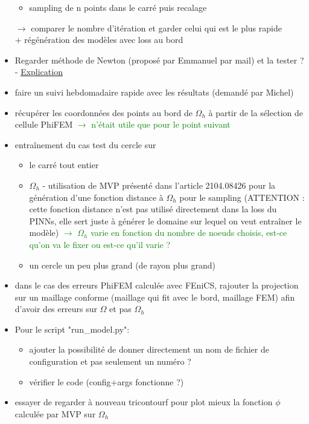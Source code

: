 \begin{itemize}[label=$\square$]
\begin{itemize}[label=\LARGE $\circ$]
		\item sampling de n points dans le carré puis recalage
	\end{itemize}
	$\rightarrow$ comparer le nombre d'itération et garder celui qui est le plus rapide \\
	+ régénération des modèles avec loss au bord
	\item Regarder méthode de Newton (proposé par Emmanuel par mail) et la tester ? - \href{https://www.mathweb.fr/euclide/methode-de-newton/}{Explication}
	\item[\done] faire un suivi hebdomadaire rapide avec les résultats (demandé par Michel)
	\item[\wontfix] récupérer les coordonnées des points au bord de $\Omega_h$ à partir de la sélection de cellule PhiFEM \textcolor{Green}{$\rightarrow$ n'était utile que pour le point suivant}
	\item entraînement du cas test du cercle sur 
	\begin{itemize}[label=\LARGE $\circ$]
		\item le carré tout entier
		\item[\swontfix] $\Omega_h$ - utilisation de MVP présenté dans l'article 2104.08426 pour la génération d'une fonction distance à $\Omega_h$ pour le sampling (ATTENTION : cette fonction distance n'est pas utilisé directement dans la loss du PINNs, elle sert juste à générer le domaine sur lequel on veut entraîner le modèle) \textcolor{Green}{$\rightarrow$ $\Omega_h$ varie en fonction du nombre de noeuds choisis, est-ce qu'on va le fixer ou est-ce qu'il varie ?}
		\item un cercle un peu plus grand (de rayon plus grand) 
	\end{itemize}
	\item dans le cas des erreurs PhiFEM calculée avec FEniCS, rajouter la projection sur un maillage conforme (maillage qui fit avec le bord, maillage FEM) afin d'avoir des erreurs sur $\Omega$ et pas $\Omega_h$
	\item Pour le script "run\_model.py":
	\begin{itemize}[label=\LARGE $\circ$]
		\item ajouter la possibilité de donner directement un nom de fichier de configuration et pas seulement un numéro ?
		\item vérifier le code (config+args fonctionne ?)
	\end{itemize}
	\item essayer de regarder à nouveau tricontourf pour plot mieux la fonction $\phi$ calculée par MVP sur $\Omega_h$

\end{itemize}
